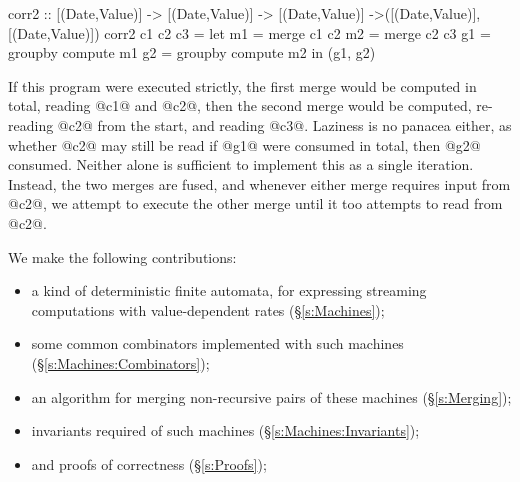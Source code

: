 \begin{code}
corr2     :: [(Date,Value)] -> [(Date,Value)]
          -> [(Date,Value)]
          ->([(Date,Value)],   [(Date,Value)])
corr2     c1 c2 c3
 = let m1 = merge c1 c2
       m2 = merge c2 c3
       g1 = groupby compute m1
       g2 = groupby compute m2
   in (g1, g2)
\end{code}

If this program were executed strictly, the first merge would be computed in total, reading @c1@ and @c2@, then the second merge would be computed, re-reading @c2@ from the start, and reading @c3@.
Laziness is no panacea either, as whether @c2@ may still be read if @g1@ were consumed in total, then @g2@ consumed.
Neither alone is sufficient to implement this as a single iteration.
Instead, the two merges are fused, and whenever either merge requires input from @c2@, we attempt to execute the other merge until it too attempts to read from @c2@.

We make the following contributions:
\begin{itemize}
\item a kind of deterministic finite automata, for expressing streaming computations with value-dependent rates (\S\ref{s:Machines});
\item some common combinators implemented with such machines (\S\ref{s:Machines:Combinators});
\item an algorithm for merging non-recursive pairs of these machines (\S\ref{s:Merging});
\item invariants required of such machines (\S\ref{s:Machines:Invariants});
\item and proofs of correctness (\S\ref{s:Proofs});
\end{itemize}


\newpage
